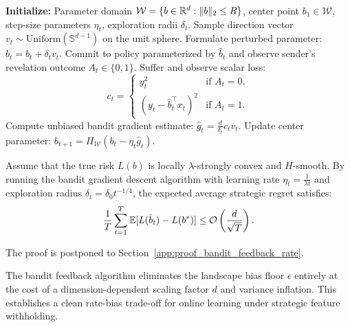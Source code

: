 \begin{algorithm}[htbp]
\caption{Strategic Bandit Online Gradient Descent (SB-OGD)}
\label{alg:regression_online_bandit}
\begin{algorithmic}[1]
\State \textbf{Initialize:} Parameter domain $\mathcal{W} = \{b \in \mathbb{R}^d : \|b\|_2 \le R\}$, center point $b_1 \in \mathcal{W}$, step-size parameters $\eta_t$, exploration radii $\delta_t$.
    \State Sample direction vector $v_t \sim \text{Uniform}(\mathbb{S}^{d-1})$ on the unit sphere.
    \State Formulate perturbed parameter: $\hat{b}_t = b_t + \delta_t v_t$.
    \State Commit to policy parameterized by $\hat{b}_t$ and observe sender's revelation outcome $A_t \in \{0, 1\}$.
    \State Suffer and observe scalar loss: 
    \begin{equation*}
        c_t = \begin{cases}
            y_t^2 & \text{if } A_t = 0, \\
            (y_t - \hat{b}_t^\top x_t)^2 & \text{if } A_t = 1.
        \end{cases}
    \end{equation*}
    \State Compute unbiased bandit gradient estimate: $\hat{g}_t = \frac{d}{\delta_t} c_t v_t$.
    \State Update center parameter: $b_{t+1} = \Pi_{\mathcal{W}}\left( b_t - \eta_t \hat{g}_t \right)$.
\EndFor
\end{algorithmic}
\end{algorithm}


\begin{theorem}
\label{thm:bandit_feedback_rate}
Assume that the true risk $L(b)$ is locally $\lambda$-strongly convex and $H$-smooth. By running the bandit gradient descent algorithm with learning rate $\eta_t = \frac{1}{\lambda t}$ and exploration radius $\delta_t = \delta_0 t^{-1/4}$, the expected average strategic regret satisfies:
\begin{equation}
    \label{eq:bandit_feedback_bound}
    \frac{1}{T}\sum_{t=1}^T \mathbb{E}[L(\hat{b}_t) - L(b^*)] \le \mathcal{O}\left( \frac{d}{\sqrt{T}} \right).
\end{equation}
\end{theorem}
The proof is postponed to Section~\ref{app:proof_bandit_feedback_rate}.

\begin{remark}
The bandit feedback algorithm eliminates the landscape bias floor $\epsilon$ entirely at the cost of a dimension-dependent scaling factor $d$ and variance inflation. This establishes a clean rate-bias trade-off for online learning under strategic feature withholding.
\end{remark}
